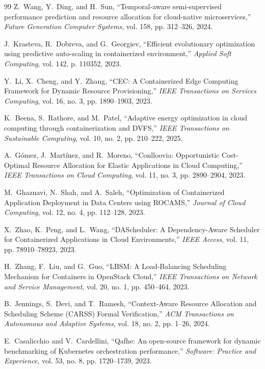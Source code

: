 \documentclass[12pt,a4paper]{report}
\begin{document}
{\begin{thebibliography}{99}
			Z.~Wang, Y.~Ding, and H.~Sun,
			``Temporal-aware semi-supervised performance prediction and resource allocation for cloud-native microservices,''
			\textit{Future Generation Computer Systems}, vol. 158, pp. 312--326, 2024.
			
			J.~Krasteva, R.~Dobreva, and G.~Georgiev,
			``Efficient evolutionary optimization using predictive auto-scaling in containerized environment,''
			\textit{Applied Soft Computing}, vol. 142, p. 110352, 2023.
			
			Y.~Li, X.~Cheng, and Y.~Zhang,
			``CEC: A Containerized Edge Computing Framework for Dynamic Resource Provisioning,''
			\textit{IEEE Transactions on Services Computing}, vol. 16, no. 3, pp. 1890--1903, 2023.
			
			K.~Beena, S.~Rathore, and M.~Patel,
			``Adaptive energy optimization in cloud computing through containerization and DVFS,''
			\textit{IEEE Transactions on Sustainable Computing}, vol. 10, no. 2, pp. 210--222, 2025.
			
			A.~G\'omez, J.~Mart\'inez, and R.~Moreno,
			``Conlloovia: Opportunistic Cost-Optimal Resource Allocation for Elastic Applications in Cloud Computing,''
			\textit{IEEE Transactions on Cloud Computing}, vol. 11, no. 3, pp. 2890--2904, 2023.
			
			M.~Ghaznavi, N.~Shah, and A.~Saleh,
			``Optimization of Containerized Application Deployment in Data Centers using ROCAMS,''
			\textit{Journal of Cloud Computing}, vol. 12, no. 4, pp. 112--128, 2023.
			
			X.~Zhao, K.~Peng, and L.~Wang,
			``DAScheduler: A Dependency-Aware Scheduler for Containerized Applications in Cloud Environments,''
			\textit{IEEE Access}, vol. 11, pp. 78910--78923, 2023.
			
			H.~Zhang, F.~Liu, and G.~Guo,
			``LBSM: A Load-Balancing Scheduling Mechanism for Containers in OpenStack Cloud,''
			\textit{IEEE Transactions on Network and Service Management}, vol. 20, no. 1, pp. 450--464, 2023.
			
			B.~Jennings, S.~Devi, and T.~Ramesh,
			``Context-Aware Resource Allocation and Scheduling Scheme (CARSS) Formal Verification,''
			\textit{ACM Transactions on Autonomous and Adaptive Systems}, vol. 18, no. 2, pp. 1--26, 2024.
			
			E.~Casalicchio and V.~Cardellini,
			``Qafhe: An open-source framework for dynamic benchmarking of Kubernetes orchestration performance,''
			\textit{Software: Practice and Experience}, vol. 53, no. 8, pp. 1720--1739, 2023.
			

\end{thebibliography}}
\end{document}

